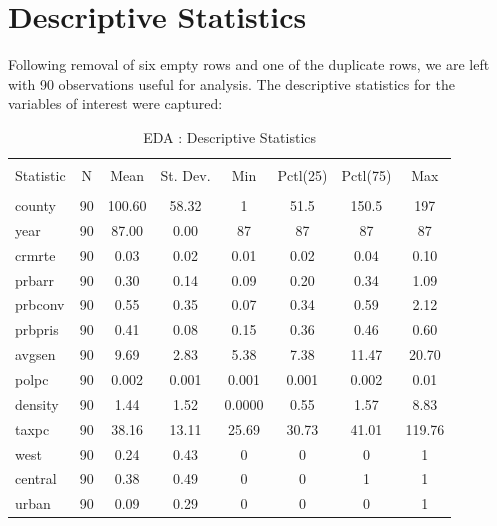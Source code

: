 \pagebreak

\section{Descriptive Statistics}
\label{sec:Descriptive Statistics}

Following removal of six empty rows and one of the duplicate rows, we are left with 90 observations useful for analysis.  The descriptive statistics for the variables of interest were captured:\\

\begin{table}[!htbp] 
	\centering 
	\small
	\caption{EDA : Descriptive Statistics} 
	\label{EDA - Descriptive Statistics} 
	\begin{tabular}{@{\extracolsep{5pt}}lccccccc} 
		\\[-1.8ex]\hline 
		\hline \\[-1.8ex] 
		Statistic & \multicolumn{1}{c}{N} & \multicolumn{1}{c}{Mean} & \multicolumn{1}{c}{St. Dev.} & \multicolumn{1}{c}{Min} & \multicolumn{1}{c}{Pctl(25)} & \multicolumn{1}{c}{Pctl(75)} & \multicolumn{1}{c}{Max} \\ 
		\hline \\[-1.8ex] 
		county & 90 & 100.60 & 58.32 & 1 & 51.5 & 150.5 & 197 \\ 
		year & 90 & 87.00 & 0.00 & 87 & 87 & 87 & 87 \\ 
		crmrte & 90 & 0.03 & 0.02 & 0.01 & 0.02 & 0.04 & 0.10 \\ 
		prbarr & 90 & 0.30 & 0.14 & 0.09 & 0.20 & 0.34 & 1.09 \\ 
		prbconv & 90 & 0.55 & 0.35 & 0.07 & 0.34 & 0.59 & 2.12 \\ 
		prbpris & 90 & 0.41 & 0.08 & 0.15 & 0.36 & 0.46 & 0.60 \\ 
		avgsen & 90 & 9.69 & 2.83 & 5.38 & 7.38 & 11.47 & 20.70 \\ 
		polpc & 90 & 0.002 & 0.001 & 0.001 & 0.001 & 0.002 & 0.01 \\ 
		density & 90 & 1.44 & 1.52 & 0.0000 & 0.55 & 1.57 & 8.83 \\ 
		taxpc & 90 & 38.16 & 13.11 & 25.69 & 30.73 & 41.01 & 119.76 \\ 
		west & 90 & 0.24 & 0.43 & 0 & 0 & 0 & 1 \\ 
		central & 90 & 0.38 & 0.49 & 0 & 0 & 1 & 1 \\ 
		urban & 90 & 0.09 & 0.29 & 0 & 0 & 0 & 1 \\ 

\end{tabular}
\end{table}
